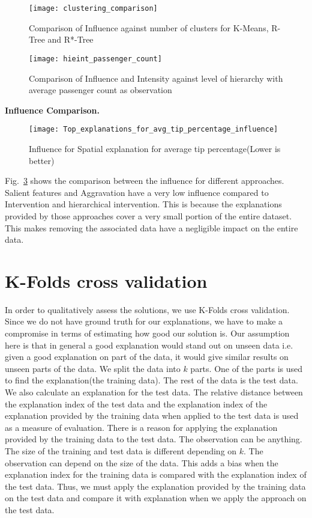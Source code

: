 \begin{figure}[H]
\texttt{[image: clustering\_comparison]}
\caption{Comparison of Influence against number of clusters for K-Means, R-Tree and R*-Tree}
\label{fig:clustering_comparison}
\end{figure}

\begin{figure}[h]
\texttt{[image: hieint\_passenger\_count]}
\caption{Comparison of Influence and Intensity against level of hierarchy with average passenger count as observation}
\label{fig:hieint_passenger_count}
\end{figure}
\textbf{Influence Comparison.}
\begin{figure}[h]
\texttt{[image: Top\_explanations\_for\_avg\_tip\_percentage\_influence]}
\caption{Influence for Spatial explanation for average tip percentage(Lower is better)}
\label{fig:influence_comparison}
\end{figure}

Fig.~\ref{fig:influence_comparison} shows the comparison between the influence for different approaches. Salient features and Aggravation have a very low influence compared to Intervention and hierarchical intervention. This is because the explanations provided by those approaches cover a very small portion of the entire dataset. This makes removing the associated data have a negligible impact on the entire data.

\section{K-Folds cross validation}
In order to qualitatively assess the solutions, we use K-Folds cross validation\citep{refaeilzadeh2009cross}. Since we do not have ground truth for our explanations, we have to make a compromise in terms of estimating how good our solution is. Our assumption here is that in general a good explanation would stand out on unseen data i.e. given a good explanation on part of the data, it would give similar results on unseen parts of the data. We split the data into $k$ parts. One of the parts is used to find the explanation(the training data). The rest of the data is the test data. We also calculate an explanation for the test data. The relative distance between the explanation index of the test data and the explanation index of the explanation provided by the training data when applied to the test data is used as a measure of evaluation.
There is a reason for applying the explanation provided by the training data to the test data. The observation can be anything. The size of the training and test data is different depending on $k$. The observation can depend on the size of the data. This adds a bias when the explanation index for the training data is compared with the explanation index of the test data. Thus, we must apply the explanation provided by the training data on the test data and compare it with explanation when we apply the approach on the test data.

